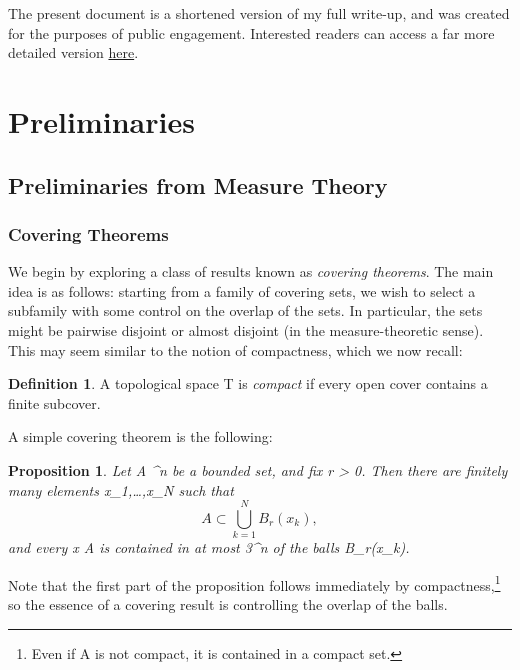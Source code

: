 \documentclass[a4paper, 11pt]{article}
\theoremstyle{plain}
\newtheorem{proposition}[theorem]{Proposition}
\theoremstyle{definition}
\newtheorem{definition}[theorem]{Definition}
\theoremstyle{remark}
\numberwithin{equation}{subsection}
\def\({}
\def\){}
\begin{document}
The present document is a shortened version of my full write-up, and was created for the purposes of public engagement. Interested readers can access a far more detailed version \href{https://arismercier.github.io/GMT_Notes/GMT_Notes.pdf}{here}.


  
\section{Preliminaries}
\label{Preliminaries}

\subsection{Preliminaries from Measure Theory}

\subsubsection{Covering Theorems}

We begin by exploring a class of results known as \emph{covering theorems}. The main idea is as follows: starting from a family of covering sets, we wish to select a subfamily with some control on the overlap of the sets. In particular, the sets might be pairwise disjoint or almost disjoint (in the measure-theoretic sense). This may seem similar to the notion of compactness, which we now recall:

\begin{definition}
A topological space \(T\) is \emph{compact} if every open cover contains a finite subcover.
\end{definition}

A simple covering theorem is the following:

\begin{proposition}
Let \(A \subset {}^{n}\) be a bounded set, and fix \(r > 0\). Then there are finitely many elements \(x_{1},\ldots,x_{N}\) such that
\begin{equation}
A \subset \bigcup_{k=1}^{N}B_{r}(x_{k}),
\end{equation}
and every \(x \in A\) is contained in at most \(3^{n}\) of the balls \(B_{r}(x_{k})\).
\end{proposition}

Note that the first part of the proposition follows immediately by compactness,\footnote{Even if A is not compact, it is contained in a compact set.} so the essence of a covering result is controlling the overlap of the balls.
\end{document}
